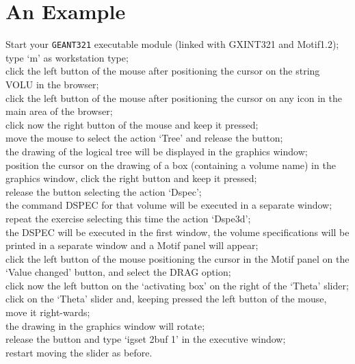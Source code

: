 \section {An Example}
Start your {\tt GEANT321} executable module 
(linked with GXINT321 and Motif1.2);
\\[.5em] type `m' as workstation type;
\\[.5em] click the left button of the mouse after positioning the cursor on the 
string VOLU in the browser;
\\[.5em] click the left button of the mouse after positioning the cursor on 
any icon in the main area of the browser;
\\[.5em] click now the right button of the mouse and keep it pressed;
\\[.5em] move the mouse to select the action `Tree' and release the button;
\\[.5em] the drawing of the logical tree will be displayed in the graphics
window;
\\[.5em] position the cursor on the drawing of a box (containing a volume name)
in the graphics window, click the right button and keep it pressed;
\\[.5em] release the button selecting the action `Dspec';
\\[.5em] the command DSPEC for that volume will be executed in a separate
window;
\\[.5em] repeat the exercise selecting this time the action `Dspe3d';
\\[.5em] the DSPEC will be executed in the first window, the volume 
specifications will be printed in a separate window and a Motif panel will
appear;
\\[.5em] click the left button of the mouse positioning the cursor in the Motif
panel on the `Value changed' button, and select the DRAG option;
\\[.5em] click now the left button on the `activating box' on the right of
the `Theta' slider;
\\[.5em] click on the `Theta' slider and, keeping pressed the left button of the
mouse, move it right-wards;
\\[.5em] the drawing in the graphics window will rotate;
\\[.5em] release the button and type `igset 2buf 1' in the executive window;
\\[.5em] restart moving the slider as before. 
